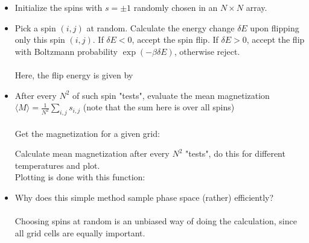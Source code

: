 \begin{itemize}
    \item Initialize the spins with $s=\pm1$ randomly 
        chosen in an $N\times N$ array. \\
        
    \item Pick a spin $(i,j)$ at random. Calculate the 
        energy change $\delta E$ upon flipping only this 
        spin $(i,j)$. If $\delta E<0$, accept the spin 
        flip. If $\delta E>0$, accept the flip with 
        Boltzmann probability $\exp(-\beta\delta E)$, 
        otherwise reject. \\
         \ \\
        \newpage
        Here, the flip energy is given by
        

    \item After every $N^2$ of such spin "tests", 
        evaluate the mean magnetization 
        $\langle M\rangle=\frac{1}{N^2}\sum_{i,j}s_{i,j}$
        (note that the sum here is over all spins) \\
        \\
        Get the magnetization for a given grid:
        
        \newpage
        Calculate mean magnetization after every $N^2$ "tests",
        do this for different temperatures and plot.
         \ \\
        Plotting is done with this function: 
         

    \item Why does this simple method sample phase 
        space (rather) efficiently? \\
        \\
        Choosing spins at random is an unbiased way of 
        doing the calculation, since all grid cells are 
        equally important. 
\end{itemize}


